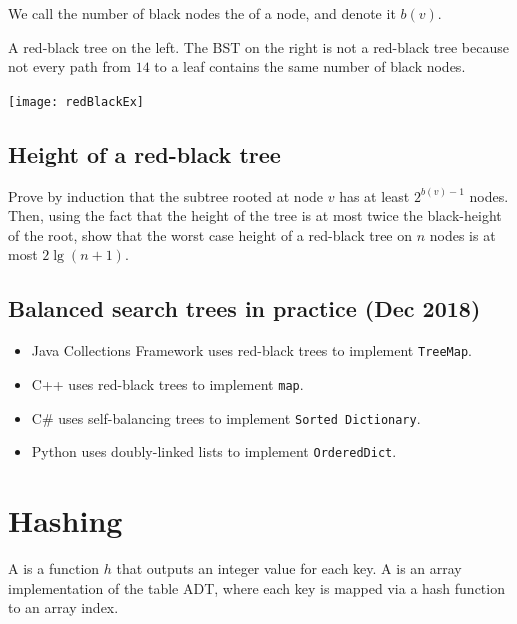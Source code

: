 We call the number of black nodes the  of a node, and denote it $b(v)$.

\begin{Boxample} \label{ex:redblackTreeEx}
A red-black tree on the left. The BST on the right is not a red-black tree 
  because not every path from $14$ to a leaf contains the same number of black nodes.
\begin{center}
  \texttt{[image: redBlackEx]}
\end{center}
\end{Boxample}

\section{Height of a red-black tree}

\begin{Boxample}[5]
Prove by induction that the subtree rooted at node $v$ has at least $2^{b(v) - 1}$ nodes.
Then, using the fact that the height of the tree is at most twice the black-height of the root,  show that the worst case height of a red-black tree on $n$ nodes 
is at most $2 \lg (n+1)$.
\end{Boxample}

\section{Balanced search trees in practice (Dec 2018)}
\begin{itemize}
\item Java Collections Framework uses red-black trees to implement \texttt{TreeMap}.
\item C++ uses red-black trees to implement \texttt{map}.
\item C\# uses self-balancing trees to implement \texttt{Sorted Dictionary}.
\item Python uses doubly-linked lists to implement \texttt{OrderedDict}.
\end{itemize}





\chapter{Hashing} %
\begin{Definition}
A  is a function $h$ that outputs an integer value for each key. 
A  is an array implementation of the table ADT, 
where each key is mapped via a hash function to an array index. 
\end{Definition}

